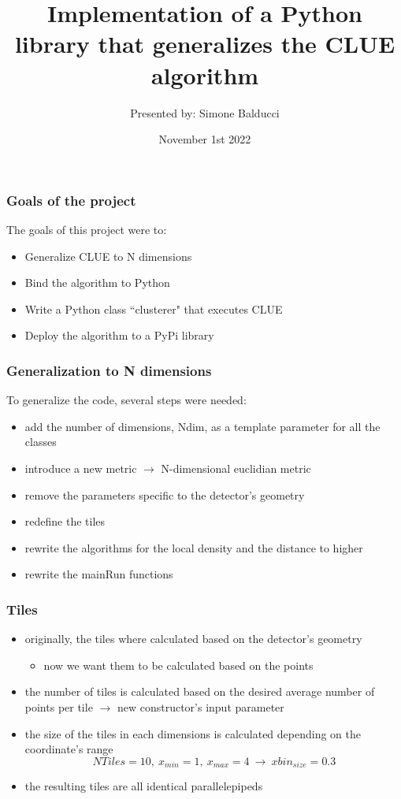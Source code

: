 \documentclass{beamer}
\title[]{Implementation of a Python library that generalizes the CLUE algorithm}
\author[Simone Balducci]{Presented by: Simone Balducci \\ \vspace{3mm}}
\institute[]{Alma Mater Studiorum-Università di Bologna}
\date{November 1st 2022}
\begin{document}
\frame{\titlepage}

\begin{frame}
\frametitle{Goals of the project}
The goals of this project were to:
\begin{itemize}
	\item Generalize CLUE to N dimensions
	\item Bind the algorithm to Python
	\item Write a Python class ``clusterer" that executes CLUE
	\item Deploy the algorithm to a PyPi library
\end{itemize}
\end{frame}
\begin{frame}
\frametitle{Generalization to N dimensions}
To generalize the code, several steps were needed:
\begin{itemize}
	\item add the number of dimensions, Ndim, as a template parameter for all the classes
	\item introduce a new metric $\longrightarrow$ N-dimensional euclidian metric
	\item remove the parameters specific to the detector's geometry
	\item redefine the tiles
	\item rewrite the algorithms for the local density and the distance to higher 
	\item rewrite the mainRun functions
\end{itemize}
\end{frame}
\begin{frame}
\frametitle{Tiles}
\begin{itemize}
	\item originally, the tiles where calculated based on the detector's geometry
	\begin{itemize}
		\item[\ding{228}] now we want them to be calculated based on the points	
	\end{itemize}
	\item the number of tiles is calculated based on the desired average number of points per tile $\longrightarrow$ new constructor's input parameter
	\item the size of the tiles in each dimensions is calculated depending on the coordinate's range
	$$
		NTiles = 10, \ x_{min} = 1, \ x_{max} = 4 \ \longrightarrow \ \boxed{xbin_{size} = 0.3}
	$$
	\item the resulting tiles are all identical parallelepipeds
\end{itemize}
\end{frame}
\end{document}
